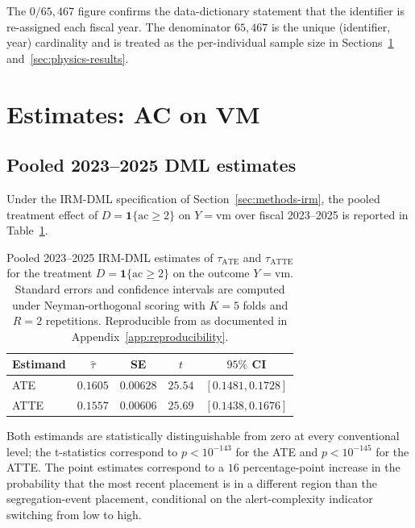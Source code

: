 \documentclass[article,shortnames,nojss]{jss}
\newcommand{\ac}{\ensuremath{\mathrm{ac}}}
\newcommand{\vm}{\ensuremath{\mathrm{vm}}}
\begin{document}
The $0/65{,}467$ figure confirms the data-dictionary statement that
the identifier is re-assigned each fiscal year. The denominator
$65{,}467$ is the unique (identifier, year) cardinality and is
treated as the per-individual sample size in
Sections~\ref{sec:dml} and~\ref{sec:physics-results}.

\section[Estimates: AC on VM]{Estimates: AC on VM}
\label{sec:dml}

\subsection{Pooled 2023--2025 DML estimates}
\label{sec:dml-pooled}

Under the IRM-DML specification of Section~\ref{sec:methods-irm}, the
pooled treatment effect of $D = \mathbf{1}\{\ac \ge 2\}$ on
$Y = \vm$ over fiscal 2023--2025 is reported in
Table~\ref{tab:res-pool}.

\begin{table}[h]
\centering
\caption{Pooled 2023--2025 IRM-DML estimates of $\tau_{\mathrm{ATE}}$
and $\tau_{\mathrm{ATTE}}$ for the treatment
$D = \mathbf{1}\{\ac \ge 2\}$ on the outcome $Y = \vm$. Standard
errors and confidence intervals are computed under
Neyman-orthogonal scoring with $K=5$ folds and $R=2$ repetitions.
Reproducible from  as documented in
Appendix~\ref{app:reproducibility}.}
\label{tab:res-pool}
\begin{tabular}{lcccc}
\toprule
Estimand & $\hat{\tau}$ & SE & $t$ & $95\%$ CI \\
\midrule
ATE  & $0.1605$ & $0.00628$ & $25.54$ & $[0.1481, 0.1728]$ \\
ATTE & $0.1557$ & $0.00606$ & $25.69$ & $[0.1438, 0.1676]$ \\
\bottomrule
\end{tabular}
\end{table}

Both estimands are statistically distinguishable from zero at every
conventional level; the t-statistics correspond to $p < 10^{-143}$
for the ATE and $p < 10^{-145}$ for the ATTE. The point estimates
correspond to a $16$ percentage-point increase in the probability
that the most recent placement is in a different region than the
segregation-event placement, conditional on the alert-complexity
indicator switching from low to high.
\end{document}
